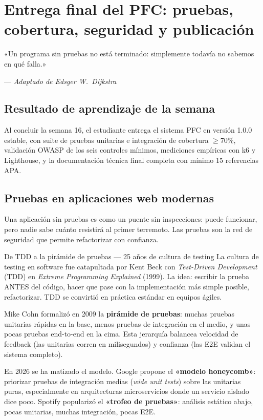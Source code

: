 \chapter{Entrega final del PFC: pruebas, cobertura, seguridad y publicación}
\label{cap:semana16}

\epigraph{«Un programa sin pruebas no está terminado: simplemente
todavía no sabemos en qué falla.»}{--- \textit{Adaptado de Edsger W.~Dijkstra}}

\section*{Resultado de aprendizaje de la semana}
Al concluir la semana 16, el estudiante entrega el sistema PFC en
versión 1.0.0 estable, con suite de pruebas unitarias e integración
de cobertura $\geq 70\%$, validación OWASP de los seis controles
mínimos, mediciones empíricas con k6 y Lighthouse, y la documentación
técnica final completa con mínimo 15 referencias APA.

\section{Pruebas en aplicaciones web modernas}

Una aplicación sin pruebas es como un puente sin
inspecciones: puede funcionar, pero nadie sabe cuánto resistirá al
primer terremoto. Las pruebas son la red de seguridad que permite
refactorizar con confianza.


\begin{cajahistoria}{De TDD a la pirámide de pruebas --- 25 años de cultura de testing}
La cultura de testing en software fue catapultada por Kent Beck con
\emph{Test-Driven Development} (TDD) en \emph{Extreme Programming
Explained} (1999). La idea: escribir la prueba ANTES del código,
hacer que pase con la implementación más simple posible, refactorizar.
TDD se convirtió en práctica estándar en equipos ágiles.

Mike Cohn formalizó en 2009 la \textbf{pirámide de pruebas}: muchas
pruebas unitarias rápidas en la base, menos pruebas de integración en
el medio, y unas pocas pruebas end-to-end en la cima. Esta jerarquía
balancea velocidad de feedback (las unitarias corren en milisegundos)
y confianza (las E2E validan el sistema completo).

En 2026 se ha matizado el modelo. Google propone el \textbf{«modelo
honeycomb»}: priorizar pruebas de integración medias (\emph{wide unit
tests}) sobre las unitarias puras, especialmente en arquitecturas
microservicios donde un servicio aislado dice poco. Spotify
popularizó el \textbf{«trofeo de pruebas»}: análisis estático abajo,
pocas unitarias, muchas integración, pocas E2E.
\end{cajahistoria}

